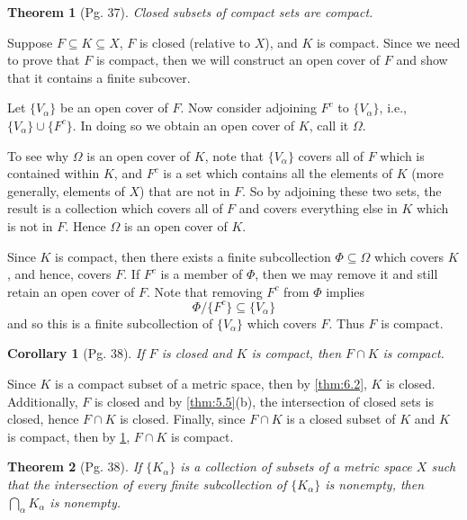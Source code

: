 \documentclass[leqno]{article}
\makeatletter
\newtheorem{theorem}{Theorem}[section]
\newtheorem{corollary}{Corollary}[theorem]
\theoremstyle{definition}
\theoremstyle{remark}
\let\oldproofname=\proofname
\renewcommand{\proofname}{\bf{\textit{\oldproofname}}}
\renewenvironment{proof}[1][\proofname]{\par
  \pushQED{\qed}%
  \normalfont \topsep6\p@\@plus6\p@\relax
  \list{}{\leftmargin=0mm
          \rightmargin=0mm
          \settowidth{\itemindent}{\itshape#1}%
          \labelwidth=4mm
          \parsep=0pt \listparindent=0mm%
  }
  \item[\hskip\labelsep
        \itshape
    #1\@addpunct{.}]\ignorespaces
}{%
  \popQED\endlist\@endpefalse
}
\makeatother
\begin{document}
            \begin{theorem}[Pg. 37]\label{thm:6.3}
                Closed subsets of compact sets are compact. 
            \end{theorem}
                \begin{proof}
                    Suppose $F\subseteq K\subseteq X$, $F$ is closed (relative to $X$), and $K$ is compact. Since we need to prove that $F$ is compact, then we will construct an open cover of $F$ and show that it contains a finite subcover.\par\hspace{4mm} Let $\{V_{\alpha}\}$ be an open cover of $F$. Now consider adjoining $F^c$ to $\{V_{\alpha}\}$, i.e., $\{V_{\alpha}\}\cup\{F^c\}$. In doing so we obtain an open cover of $K$, call it $\Omega$.\par\hspace{4mm} To see why $\Omega$ is an open cover of $K$, note that $\{V_{\alpha}\}$ covers all of $F$ which is contained within $K$, and $F^c$ is a set which contains all the elements of $K$ (more generally, elements of $X$) that are not in $F$. So by adjoining these two sets, the result is a collection which covers all of $F$ and covers everything else in $K$ which is not in $F$. Hence $\Omega$ is an open cover of $K$.\par\hspace{4mm} Since $K$ is compact, then there exists a finite subcollection $\Phi\subseteq\Omega$ which covers $K$, and hence, covers $F$. If $F^c$ is a member of $\Phi$, then we may remove it and still retain an open cover of $F$. Note that removing $F^c$ from $\Phi$ implies
                        \begin{equation*}
                            \Phi/\{F^c\}\subseteq\{V_{\alpha}\}
                        \end{equation*}
                    and so this is a finite subcollection of $\{V_{\alpha}\}$ which covers $F$. Thus $F$ is compact.
                \end{proof}
            \begin{corollary}[Pg. 38]\label{cor:6.3.1}
                If $F$ is closed and $K$ is compact, then $F\cap K$ is compact. 
            \end{corollary}
                \begin{proof}
                    Since $K$ is a compact subset of a metric space, then by \cref{thm:6.2}, $K$ is closed. Additionally, $F$ is closed and by \cref{thm:5.5}(b), the intersection of closed sets is closed, hence $F\cap K$ is closed. Finally, since $F\cap K$ is a closed subset of $K$ and $K$ is compact, then by \cref{thm:6.3}, $F\cap K$ is compact. 
                \end{proof}
            \begin{theorem}[Pg. 38]\label{thm:6.4}
                If $\{K_{\alpha}\}$ is a collection of subsets of a metric space $X$ such that the intersection of every finite subcollection of $\{K_{\alpha}\}$ is nonempty, then $\bigcap_{\alpha} K_{\alpha}$ is nonempty. 
            \end{theorem}
    \newpage
    \printbibliography
 
\end{document}
